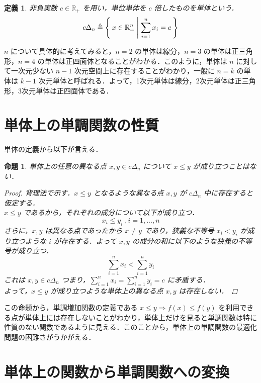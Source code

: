 \documentclass[a4paper,11pt]{jreport}
\newtheorem{definition}{定義}
\newtheorem{proposition}{命題}
\begin{document}
\begin{definition}
非負実数 $ c \in \mathbb{R}_+ $ を用い，単位単体を $ c $ 倍したものを単体という．
$$ c \Delta_n \triangleq \Set{ x \in \mathbb{R}^n_{+} | \sum_{i=1}^{n} x_i = c } $$
\end{definition}

$ n $ について具体的に考えてみると，$ n=2 $ の単体は線分，$ n=3 $ の単体は正三角形，$ n=4 $ の単体は正四面体となることがわかる．このように，単体は $ n $ に対して一次元少ない $ n - 1 $ 次元空間上に存在することがわかり，一般に $ n = k $ の単体は $ k - 1 $ 次元単体と呼ばれる．よって，1次元単体は線分，2次元単体は正三角形，3次元単体は正四面体である．\par

\section{単体上の単調関数の性質}

単体の定義から以下が言える．

\begin{proposition} \label{prop:inequality_on_simplex}
単体上の任意の異なる点 $ x, y \in c \Delta_n $ について $ x \leq y $ が成り立つことはない．

\begin{proof}
背理法で示す．$ x \leq y $ となるような異なる点 $ x, y $ が $ c \Delta_n $ 中に存在すると仮定する．\\
$ x \leq y $ であるから，それぞれの成分について以下が成り立つ．
$$ x_i \leq y_i \;, i = 1, ..., n $$
さらに，$ x , y $ は異なる点であったから $ x \neq y $ であり，狭義な不等号 $ x_i < y_i $ が成り立つような $ i $ が存在する．よって $ x, y $ の成分の和に以下のような狭義の不等号が成り立つ．
$$ \sum_{i=1}^n x_i < \sum_{i=1}^n y_i $$
これは $ x, y \in c \Delta_n $ つまり，$ \sum_{i=1}^n x_i = \sum_{i=1}^n y_i = c $ に矛盾する．\\
よって，$ x \leq y $ が成り立つような単体上の異なる点 $ x, y $ は存在しない．
\end{proof}

\end{proposition}

この命題から，単調増加関数の定義である $ x \leq y \Rightarrow f(x) \leq f(y) $ を利用できる点が単体上には存在しないことがわかり，単体上だけを見ると単調関数は特に性質のない関数であるように見える．このことから，単体上の単調関数の最適化問題の困難さがうかがえる．

\section{単体上の関数から単調関数への変換}
\end{document}
